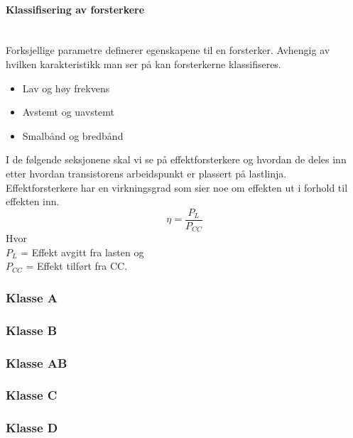 \paragraph{Klassifisering av forsterkere} \mbox{} \\
Forksjellige parametre definerer egenskapene til en forsterker.
Avhengig av hvilken karakteristikk man ser på kan forsterkerne klassifiseres.
\\
\begin{itemize}
\item Lav og høy frekvens
\item Avstemt og uavstemt
\item Smalbånd og bredbånd
\end{itemize}

I de følgende seksjonene skal vi se på effektforsterkere og hvordan de deles inn
etter hvordan transistorens arbeidspunkt er plassert på lastlinja.
\\
Effektforsterkere har en virkningsgrad som sier noe om effekten ut
i forhold til effekten inn.
$$\eta = \frac{P_L}{P_{CC}} $$
Hvor \\
 $P_L$ = Effekt avgitt fra lasten og \\
$P_{CC}$ = Effekt tilført fra CC.

\subsubsection{Klasse A}


\subsubsection{Klasse B}


\subsubsection{Klasse AB}


\subsubsection{Klasse C}


\subsubsection{Klasse D}

